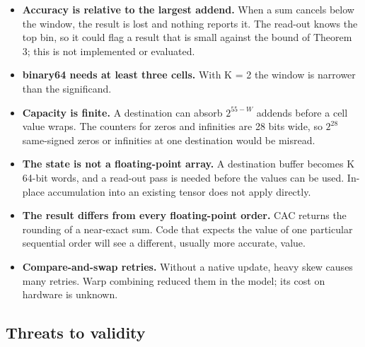 \documentclass[3p,10pt]{elsarticle}
\begin{document}
\begin{itemize}
\item
  \textbf{Accuracy is relative to the largest addend.} When a sum
  cancels below the window, the result is lost and nothing reports it.
  The read-out knows the top bin, so it could flag a result that is
  small against the bound of Theorem 3; this is not implemented or
  evaluated.
\item
  \textbf{binary64 needs at least three cells.} With K = 2 the window is
  narrower than the significand.
\item
  \textbf{Capacity is finite.} A destination can absorb \(2^{55−W}\)
  addends before a cell value wraps. The counters for zeros and
  infinities are 28 bits wide, so \(2^{28}\) same-signed zeros or
  infinities at one destination would be misread.
\item
  \textbf{The state is not a floating-point array.} A destination buffer
  becomes K 64-bit words, and a read-out pass is needed before the
  values can be used. In-place accumulation into an existing tensor does
  not apply directly.
\item
  \textbf{The result differs from every floating-point order.} CAC
  returns the rounding of a near-exact sum. Code that expects the value
  of one particular sequential order will see a different, usually more
  accurate, value.
\item
  \textbf{Compare-and-swap retries.} Without a native update, heavy skew
  causes many retries. Warp combining reduced them in the model; its
  cost on hardware is unknown.
\end{itemize}

\hypertarget{threats-to-validity}{%
\subsection{Threats to validity}\label{threats-to-validity}}
\end{document}
